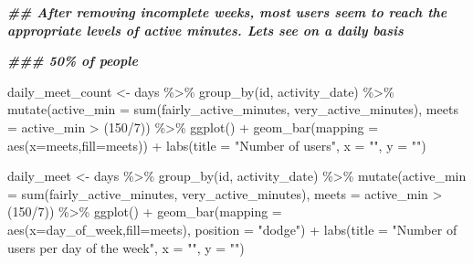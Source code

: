 \documentclass[
]{article}
\newenvironment{Shaded}{\begin{snugshade}}{\end{snugshade}}
\newcommand{\AttributeTok}[1]{\textcolor[rgb]{0.77,0.63,0.00}{#1}}
\newcommand{\DecValTok}[1]{\textcolor[rgb]{0.00,0.00,0.81}{#1}}
\newcommand{\DocumentationTok}[1]{\textcolor[rgb]{0.56,0.35,0.01}{\textbf{\textit{#1}}}}
\newcommand{\FunctionTok}[1]{\textcolor[rgb]{0.00,0.00,0.00}{#1}}
\newcommand{\NormalTok}[1]{#1}
\newcommand{\OtherTok}[1]{\textcolor[rgb]{0.56,0.35,0.01}{#1}}
\newcommand{\SpecialCharTok}[1]{\textcolor[rgb]{0.00,0.00,0.00}{#1}}
\newcommand{\StringTok}[1]{\textcolor[rgb]{0.31,0.60,0.02}{#1}}
\begin{document}
\begin{Shaded}
\begin{Highlighting}[]
\DocumentationTok{\#\# After removing incomplete weeks, most users seem to reach the appropriate levels of active minutes. Let\textquotesingle{}s see on a daily basis}

\DocumentationTok{\#\#\# 50\% of people }

\NormalTok{daily\_meet\_count }\OtherTok{\textless{}{-}}\NormalTok{ days }\SpecialCharTok{\%\textgreater{}\%}
  \FunctionTok{group\_by}\NormalTok{(id, activity\_date) }\SpecialCharTok{\%\textgreater{}\%}
  \FunctionTok{mutate}\NormalTok{(}\AttributeTok{active\_min =} \FunctionTok{sum}\NormalTok{(fairly\_active\_minutes, very\_active\_minutes),}
         \AttributeTok{meets =}\NormalTok{ active\_min }\SpecialCharTok{\textgreater{}}\NormalTok{ (}\DecValTok{150}\SpecialCharTok{/}\DecValTok{7}\NormalTok{)) }\SpecialCharTok{\%\textgreater{}\%}
  \FunctionTok{ggplot}\NormalTok{() }\SpecialCharTok{+} \FunctionTok{geom\_bar}\NormalTok{(}\AttributeTok{mapping =} \FunctionTok{aes}\NormalTok{(}\AttributeTok{x=}\NormalTok{meets,}\AttributeTok{fill=}\NormalTok{meets)) }\SpecialCharTok{+}
  \FunctionTok{labs}\NormalTok{(}\AttributeTok{title =} \StringTok{"Number of users"}\NormalTok{, }\AttributeTok{x =} \StringTok{""}\NormalTok{, }\AttributeTok{y =} \StringTok{""}\NormalTok{)}

\NormalTok{daily\_meet }\OtherTok{\textless{}{-}}\NormalTok{ days }\SpecialCharTok{\%\textgreater{}\%}
  \FunctionTok{group\_by}\NormalTok{(id, activity\_date) }\SpecialCharTok{\%\textgreater{}\%}
  \FunctionTok{mutate}\NormalTok{(}\AttributeTok{active\_min =} \FunctionTok{sum}\NormalTok{(fairly\_active\_minutes, very\_active\_minutes),}
         \AttributeTok{meets =}\NormalTok{ active\_min }\SpecialCharTok{\textgreater{}}\NormalTok{ (}\DecValTok{150}\SpecialCharTok{/}\DecValTok{7}\NormalTok{)) }\SpecialCharTok{\%\textgreater{}\%}
  \FunctionTok{ggplot}\NormalTok{() }\SpecialCharTok{+} \FunctionTok{geom\_bar}\NormalTok{(}\AttributeTok{mapping =} \FunctionTok{aes}\NormalTok{(}\AttributeTok{x=}\NormalTok{day\_of\_week,}\AttributeTok{fill=}\NormalTok{meets), }\AttributeTok{position =} \StringTok{"dodge"}\NormalTok{) }\SpecialCharTok{+}
  \FunctionTok{labs}\NormalTok{(}\AttributeTok{title =} \StringTok{"Number of users per day of the week"}\NormalTok{, }
       \AttributeTok{x =} \StringTok{""}\NormalTok{, }\AttributeTok{y =} \StringTok{""}\NormalTok{)}


\end{Highlighting}
\end{Shaded}
\end{document}
